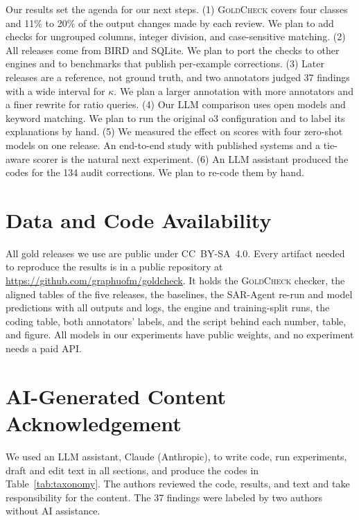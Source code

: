 \documentclass[conference]{IEEEtran}
\newcommand{\sys}{\textsc{GoldCheck}}
\begin{document}
Our results set the agenda for our next steps. (1) \sys{} covers four classes
and 11\% to 20\% of the output changes made by each review. We plan to add
checks for ungrouped columns, integer division, and case-sensitive matching. (2)
All releases come from BIRD and SQLite. We plan to port the checks to other
engines and to benchmarks that publish per-example corrections. (3) Later
releases are a reference, not ground truth, and two annotators judged 37
findings with a wide interval for $\kappa$. We plan a larger annotation with
more annotators and a finer rewrite for ratio queries. (4) Our LLM comparison
uses open models and keyword matching. We plan to run the original o3
configuration and to label its explanations by hand. (5) We measured the effect
on scores with four zero-shot models on one release. An end-to-end study with
published systems and a tie-aware scorer is the natural next experiment. (6) An
LLM assistant produced the codes for the 134 audit corrections. We plan to
re-code them by hand.

\section*{Data and Code Availability}
All gold releases we use are public under CC~BY-SA~4.0. Every artifact needed to
reproduce the results is in a public repository at \url{https://github.com/graphuofm/goldcheck}.
It holds the \sys{} checker, the aligned tables of the five releases, the
baselines, the SAR-Agent re-run and model predictions with all outputs and logs,
the engine and training-split runs, the coding table, both annotators' labels,
and the script behind each number, table, and figure. All models in our
experiments have public weights, and no experiment needs a paid API.

\section*{AI-Generated Content Acknowledgement}
We used an LLM assistant, Claude (Anthropic), to write code, run experiments,
draft and edit text in all sections, and produce the codes in
Table~\ref{tab:taxonomy}. The authors reviewed the code, results, and text and
take responsibility for the content. The 37 findings were labeled by two authors
without AI assistance.



\end{document}
